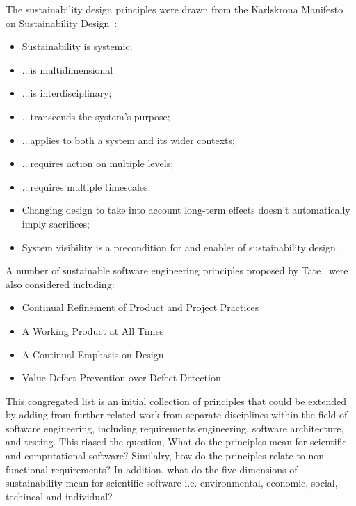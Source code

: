 The sustainability design principles were drawn from the Karlskrona Manifesto on Sustainability Design~\cite{karlskrona,SEIS2015}:
\begin{itemize}
\item Sustainability is systemic;
\item ...is multidimensional
\item ...is interdisciplinary;
\item ...transcends the system's purpose;
\item ...applies to both a system and its wider contexts;
\item ...requires action on multiple levels;
\item ...requires multiple timescales;
\item Changing design to take into account long-term effects doesn't automatically imply sacrifices;
\item System visibility is a precondition for and enabler of sustainability design.
\end{itemize}

A number of sustainable software engineering principles proposed by Tate~\cite{tate2005} were also considered including:

\begin{itemize}
\item Continual Refinement of Product and Project Practices
\item A Working Product at All Times
\item A Continual Emphasis on Design
\item Value Defect Prevention over Defect Detection
\end{itemize}

This congregated list is an initial collection of principles that could be extended by adding from further related work from separate disciplines within the field of software engineering, including requirements engineering, software architecture, and testing. This riased the question, What do the principles mean for scientific and computational software? Similalry, how do the principles relate to non-functional requirements? %
In addition, what do the five dimensions of sustainability mean for scientific software i.e. environmental, economic, social, techincal and individual?

